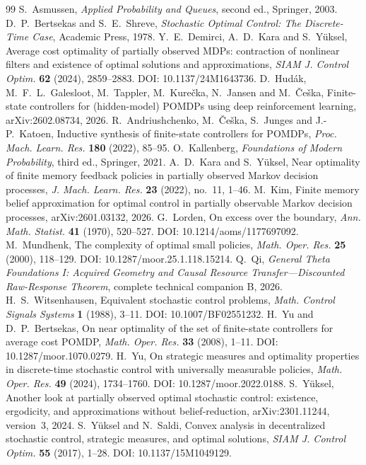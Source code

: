 \begin{thebibliography}{99}
 S.~Asmussen, \emph{Applied Probability and Queues}, second ed., Springer, 2003.
 D.~P.~Bertsekas and S.~E.~Shreve, \emph{Stochastic Optimal Control: The Discrete-Time Case}, Academic Press, 1978.
 Y.~E.~Demirci, A.~D.~Kara and S.~Y\"uksel, Average cost optimality of partially observed MDPs: contraction of nonlinear filters and existence of optimal solutions and approximations, \emph{SIAM J. Control Optim.} \textbf{62} (2024), 2859--2883. DOI: 10.1137/24M1643736.
 D.~Hud\'ak, M.~F.~L.~Galesloot, M.~Tappler, M.~Kure\v{c}ka, N.~Jansen and M.~\v{C}e\v{s}ka, Finite-state controllers for (hidden-model) POMDPs using deep reinforcement learning, arXiv:2602.08734, 2026.
 R.~Andriushchenko, M.~\v{C}e\v{s}ka, S.~Junges and J.-P.~Katoen, Inductive synthesis of finite-state controllers for POMDPs, \emph{Proc. Mach. Learn. Res.} \textbf{180} (2022), 85--95.
 O.~Kallenberg, \emph{Foundations of Modern Probability}, third ed., Springer, 2021.
 A.~D.~Kara and S.~Y\"uksel, Near optimality of finite memory feedback policies in partially observed Markov decision processes, \emph{J. Mach. Learn. Res.} \textbf{23} (2022), no.~11, 1--46.
 M.~Kim, Finite memory belief approximation for optimal control in partially observable Markov decision processes, arXiv:2601.03132, 2026.
 G.~Lorden, On excess over the boundary, \emph{Ann. Math. Statist.} \textbf{41} (1970), 520--527. DOI: 10.1214/aoms/1177697092.
 M.~Mundhenk, The complexity of optimal small policies, \emph{Math. Oper. Res.} \textbf{25} (2000), 118--129. DOI: 10.1287/moor.25.1.118.15214.
 Q.~Qi, \emph{General Theta Foundations I: Acquired Geometry and Causal Resource Transfer---Discounted Raw-Response Theorem}, complete technical companion B, 2026.
 H.~S.~Witsenhausen, Equivalent stochastic control problems, \emph{Math. Control Signals Systems} \textbf{1} (1988), 3--11. DOI: 10.1007/BF02551232.
 H.~Yu and D.~P.~Bertsekas, On near optimality of the set of finite-state controllers for average cost POMDP, \emph{Math. Oper. Res.} \textbf{33} (2008), 1--11. DOI: 10.1287/moor.1070.0279.
 H.~Yu, On strategic measures and optimality properties in discrete-time stochastic control with universally measurable policies, \emph{Math. Oper. Res.} \textbf{49} (2024), 1734--1760. DOI: 10.1287/moor.2022.0188.
 S.~Y\"uksel, Another look at partially observed optimal stochastic control: existence, ergodicity, and approximations without belief-reduction, arXiv:2301.11244, version~3, 2024.
 S.~Y\"uksel and N.~Saldi, Convex analysis in decentralized stochastic control, strategic measures, and optimal solutions, \emph{SIAM J. Control Optim.} \textbf{55} (2017), 1--28. DOI: 10.1137/15M1049129.
\end{thebibliography}
